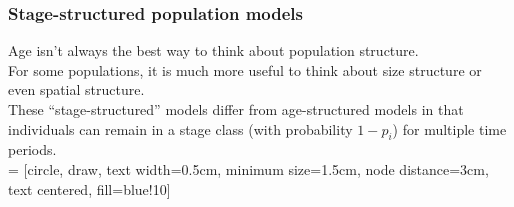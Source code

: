 \documentclass[color=usenames,dvipsnames]{beamer}\usepackage[]{graphicx}\usepackage[]{color}
\begin{document}
\begin{frame}
  \frametitle{Stage-structured population models}
  \small
  Age isn't always the best way to think about population structure. \\
  \pause
  \vfill
  For some populations, it is much more useful to think about size
      structure or even spatial structure. \\
  \pause
  \vfill
  These ``stage-structured'' models differ from age-structured models
  in that individuals can remain in a stage class (with
  probability $1-p_i$) for multiple time periods. \\
   = [circle, draw, text width=0.5cm, minimum size=1.5cm,
  node distance=3cm, text centered, fill=blue!10]
  \begin{center}
  \end{center}
\end{frame}
\end{document}
